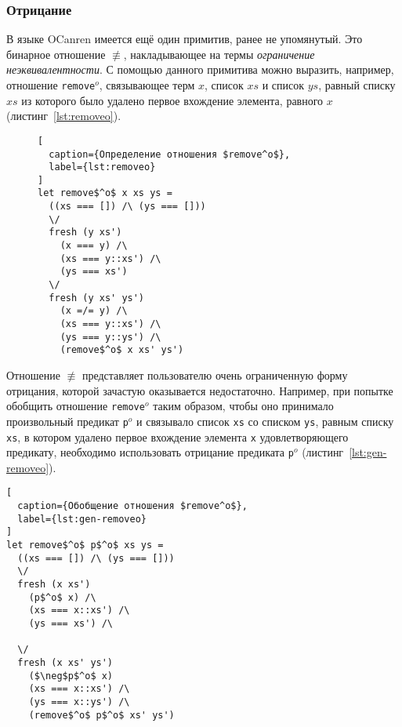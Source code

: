 \subsubsection{Отрицание}

\label{sec:negation}

В языке OCanren имеется ещё один примитив, ранее не упомянутый.
Это бинарное отношение $\not\equiv$, 
накладывающее на термы \emph{ограничение неэквивалентности}.
С помощью данного примитива можно выразить, например, отношение 
\texttt{remove$^o$}, связывающее терм $x$, список $xs$ 
и список $ys$, равный списку $xs$ из которого 
было удалено первое вхождение элемента, равного $x$ (листинг~\ref{lst:removeo}).

\begin{figure}[hbt]
\begin{minipage}{\linewidth}
\begin{lstlisting}[
  caption={Определение отношения $remove^o$},
  label={lst:removeo}
]
let remove$^o$ x xs ys =
  ((xs === []) /\ (ys === []))
  \/
  fresh (y xs')
    (x === y) /\
    (xs === y::xs') /\ 
    (ys === xs')
  \/
  fresh (y xs' ys')
    (x =/= y) /\
    (xs === y::xs') /\
    (ys === y::ys') /\
    (remove$^o$ x xs' ys')
\end{lstlisting}
\end{minipage}
\end{figure}

Отношение $\not\equiv$ представляет пользователю очень ограниченную форму отрицания,
которой зачастую оказывается недостаточно.
Например, при попытке обобщить отношение \texttt{remove$^o$} таким образом, 
чтобы оно принимало произвольный предикат \texttt{p$^o$} и связывало
список \texttt{xs} со списком \texttt{ys},
равным списку \texttt{xs}, в котором удалено 
первое вхождение элемента \texttt{x} удовлетворяющего предикату, 
необходимо использовать отрицание предиката \texttt{p$^o$} (листинг~\ref{lst:gen-removeo}).

\begin{minipage}{\linewidth}
\begin{lstlisting}[
  caption={Обобщение отношения $remove^o$},
  label={lst:gen-removeo}
]
let remove$^o$ p$^o$ xs ys =
  ((xs === []) /\ (ys === []))
  \/
  fresh (x xs')
    (p$^o$ x) /\
    (xs === x::xs') /\ 
    (ys === xs') /\
    
  \/
  fresh (x xs' ys')
    ($\neg$p$^o$ x)
    (xs === x::xs') /\
    (ys === x::ys') /\
    (remove$^o$ p$^o$ xs' ys')
\end{lstlisting}
\end{minipage}

